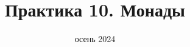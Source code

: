
\newif\ifhandout




\title[10. Монады]{Практика 10. Монады}
\date{осень 2024}



    \setcounter{framenumber}{-1}
    \maketitle


